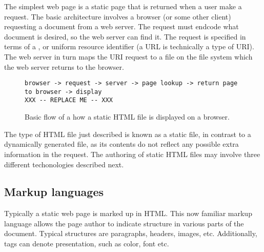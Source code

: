 




The simplest web page is a static page that is returned when a user
make a request. The basic architecture involves a browser (or some
other client) requesting a document from a web server. The request
must endcode what document is desired, so the web server can find
it. The request is specified in terms of a , or uniform
resource identifier (a URL is technically a type
of URI). The web server in turn maps the URI request to a file on the
file system which the web server returns to the browser.

\begin{figure}
  \centering
\begin{verbatim}
browser -> request -> server -> page lookup -> return page to browser -> display
XXX -- REPLACE ME -- XXX
\end{verbatim}
  \caption{Basic flow of a how a static HTML file is displayed on a browser.}
  \label{fig:static-html-file}
\end{figure}


The type of HTML file just described is known as a static file, in contrast to a
dynamically generated file, as its contents do not reflect any
possible extra information in the request. The authoring of static HTML files
may involve three different techonologies described next.


\subsection{Markup languages}
\label{sec:markup-languages}

Typically a static web page is marked up in HTML. This now familiar
markup language allows the page author to indicate structure in
various parts of the document. Typical structures are paragraphs,
headers, images, etc. Additionally, tags can denote presentation, such
as color, font etc.

